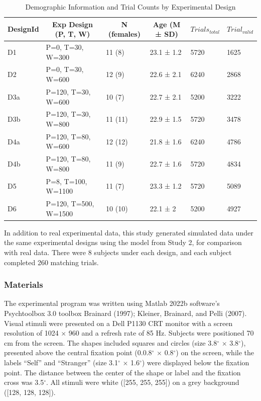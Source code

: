\documentclass[
  english,
  man,floatsintext]{apa6}
\begin{document}
\begin{table}[tbp]

\begin{center}
\begin{threeparttable}

\caption{\label{tab:tbl-demographics}Demographic Information and Trial Counts by Experimental Design}

\begin{tabular}{llllll}
\toprule
DesignId & \multicolumn{1}{c}{Exp Design (P, T, W)} & \multicolumn{1}{c}{N (females)} & \multicolumn{1}{c}{Age (M ± SD)} & \multicolumn{1}{c}{$Trials_{total}$} & \multicolumn{1}{c}{$Trial_{valid}$}\\
\midrule
D1 & P=0, T=30, W=300 & 11 (8) & 23.1 ± 1.2 & 5720 & 1625\\
D2 & P=0, T=30, W=600 & 12 (9) & 22.6 ± 2.1 & 6240 & 2868\\
D3a & P=120, T=30, W=600 & 10 (7) & 22.7 ± 2.1 & 5200 & 3222\\
D3b & P=120, T=30, W=800 & 11 (11) & 22.9 ± 1.5 & 5720 & 3478\\
D4a & P=120, T=80, W=600 & 12 (12) & 21.8 ± 1.6 & 6240 & 4786\\
D4b & P=120, T=80, W=800 & 11 (9) & 22.7 ± 1.6 & 5720 & 4834\\
D5 & P=8, T=100, W=1100 & 11 (7) & 23.3 ± 1.2 & 5720 & 5089\\
D6 & P=120, T=500, W=1500 & 10 (10) & 22.1 ± 2 & 5200 & 4927\\
\bottomrule
\end{tabular}

\end{threeparttable}
\end{center}

\end{table}

In addition to real experimental data, this study generated simulated data under the same experimental designs using the model from Study 2, for comparison with real data. There were 8 subjects under each design, and each subject completed 260 matching trials.

\subsubsection{Materials}\label{materials}

The experimental program was written using Matlab 2022b software's Psychtoolbox 3.0 toolbox Brainard (1997); Kleiner, Brainard, and Pelli (2007). Visual stimuli were presented on a Dell P1130 CRT monitor with a screen resolution of 1024 \(\times\) 960 and a refresh rate of 85 Hz. Subjects were positioned 70 cm from the screen. The shapes included squares and circles (size 3.8\(^\circ\) \(\times\) 3.8\(^\circ\)), presented above the central fixation point (0.0.8\(^\circ\) \(\times\) 0.8\(^\circ\)) on the screen, while the labels ``Self'' and ``Stranger'' (size 3.1\(^\circ\) \(\times\) 1.6\(^\circ\)) were displayed below the fixation point. The distance between the center of the shape or label and the fixation cross was 3.5\(^\circ\). All stimuli were white ({[}255, 255, 255{]}) on a grey background ({[}128, 128, 128{]}).
\end{document}
